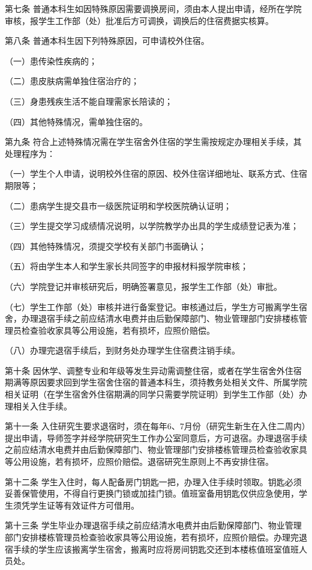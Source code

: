 \documentclass[UTF8,12pt,a4paper]{report}
\begin{document}
第七条 普通本科生如因特殊原因需要调换房间，须由本人提出申请，经所在学院审核，报学生工作部（处）批准后方可调换，调换后的住宿费据实核算。

第八条 普通本科生因下列特殊原因，可申请校外住宿。

（一）患传染性疾病的；

（二）患皮肤病需单独住宿治疗的；

（三）身患残疾生活不能自理需家长陪读的；

（四）其他特殊情况，需单独住宿的。

第九条 符合上述特殊情况需在学生宿舍外住宿的学生需按规定办理相关手续，其处理程序为：

（一）学生个人申请，说明校外住宿的原因、校外住宿详细地址、联系方式、住宿期限等；

（二）患病学生提交县市一级医院证明和学校医院确认证明；

（三）学生提交学习成绩情况说明，以学院教学办出具的学生成绩登记表为准；

（四）其他特殊情况，须提交学校有关部门书面确认；

（五）将由学生本人和学生家长共同签字的申报材料报学院审核；

（六）学院登记并审核研究后，明确签署意见，报学生工作部（处）审批。

（七）学生工作部（处）审核并进行备案登记。审核通过后，学生方可搬离学生宿舍，办理退宿手续之前应结清水电费并由后勤保障部门、物业管理部门安排楼栋管理员检查验收家具等公用设施，若有损坏，应照价赔偿。

（八）办理完退宿手续后，到财务处办理学生住宿费注销手续。

第十条 因休学、调整专业和年级等发生异动需调整住宿，或者在学生宿舍外住宿期满等原因要求回到学生宿舍住宿的普通本科生，须持教务处相关文件、所属学院相关证明（在学生宿舍外住宿期满的同学只需要学院证明）到学生工作部（处）办理相关入住手续。

第十一条 入住研究生要求退宿时，须在每年6、7月份（研究生新生在入住二周内）提出申请，导师签字并经学院研究生工作办公室同意后，方可退宿。办理退宿手续之前应结清水电费并由后勤保障部门、物业管理部门安排楼栋管理员检查验收家具等公用设施，若有损坏，应照价赔偿。退宿研究生原则上不再安排住宿。

第十二条 学生入住时，每人配备房门钥匙一把，办理入住手续时领取。钥匙必须妥善保管使用，不得自行更换门锁或加挂门锁。值班室备用钥匙仅供应急使用，学生须凭学生证等有效证件方可借用。

第十三条 学生毕业办理退宿手续之前应结清水电费并由后勤保障部门、物业管理部门安排楼栋管理员检查验收家具等公用设施，若有损坏，应照价赔偿。办理完退宿手续的学生应该搬离学生宿舍，搬离时应将房间钥匙交还到本楼栋值班室值班人员处。
\end{document}
